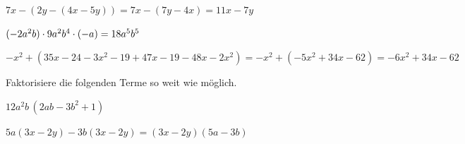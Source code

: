\documentclass[11pt]{exam}
\begin{document}
\begin{questions}
{\begin{solution}
	$7x-(2y-(4x-5y))=7x-(7y-4x)=11x-7y$
\end{solution}}
{}
{\begin{solution}
	$(-2a^2b)\cdot9a^2b^4\cdot(-a)=18a^5b^5$
\end{solution}}
{}
{\begin{solution}
	$-x^2+(35x-24-3x^2-19+47x-19-48x-2x^2)=-x^2+(-5x^2+34x-62)=-6x^2+34x-62$
\end{solution}}
{}


\newpage %
\noaddpoints
\question[\totalpoints]
\addpoints
Faktorisiere die folgenden Terme so weit wie möglich.
{\begin{solution}
	$12a^2b\,(2ab-3b^2+1)$
\end{solution}}
{}
{\begin{solution}
	$5a(3x-2y)-3b(3x-2y)=(3x-2y)(5a-3b)$
\end{solution}}
{}
\begin{parts}
	\setcounter{partno}{2}

\end{parts}
\end{questions}
\end{document}
